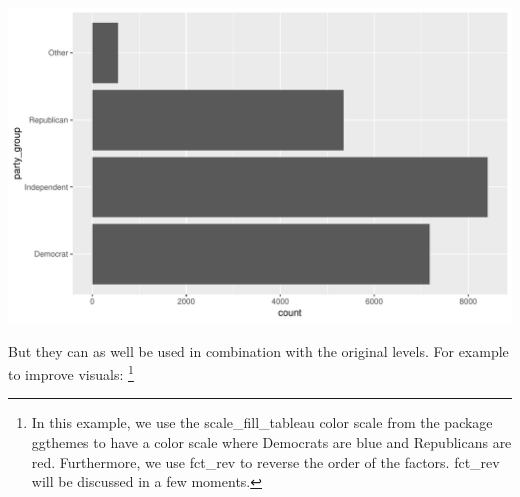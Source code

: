 \documentclass[]{tufte-book}
\newenvironment{Shaded}{}{}
\newcommand{\KeywordTok}[1]{\textcolor[rgb]{0.00,0.44,0.13}{\textbf{#1}}}
\newcommand{\DataTypeTok}[1]{\textcolor[rgb]{0.56,0.13,0.00}{#1}}
\newcommand{\StringTok}[1]{\textcolor[rgb]{0.25,0.44,0.63}{#1}}
\newcommand{\OperatorTok}[1]{\textcolor[rgb]{0.40,0.40,0.40}{#1}}
\newcommand{\NormalTok}[1]{#1}
\begin{document}
\begin{Shaded}
\end{Shaded}

\includegraphics{cleaning_tutorial_files/figure-latex/unnamed-chunk-74-1}

But they can as well be used in combination with the original levels.
For example to improve visuals: \footnote{In this example, we use the
  scale\_fill\_tableau color scale from the package ggthemes to have a
  color scale where Democrats are blue and Republicans are red.
  Furthermore, we use fct\_rev to reverse the order of the factors.
  fct\_rev will be discussed in a few moments.}

\begin{Shaded}
\end{Shaded}
\end{document}
